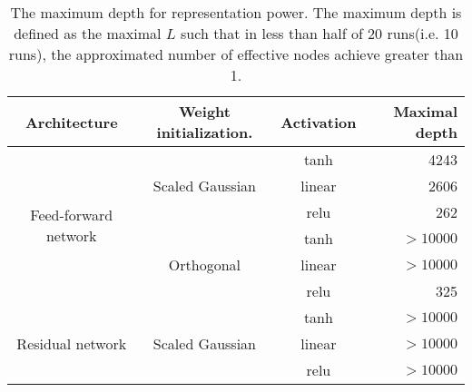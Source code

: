 \begin{table}[h]
    \centering
    \begin{tabular}{|c|c|c|r|}
    \hline
        Architecture&Weight initialization.&Activation&Maximal depth\\\hline
        \multirow{6}{*}{Feed-forward network} & \multirow{3}{*}{Scaled Gaussian} & tanh & 4243\\\cline{3-4}
         &  & linear & 2606\\\cline{3-4}
         &  & relu   & 262 \\\cline{2-4}
         & \multirow{3}{*}{Orthogonal} & tanh   & $>10000$\\\cline{3-4}
         &  & linear & $>10000$\\\cline{3-4}
         &  & relu   & 325\\\hline
         \multirow{3}{*}{Residual network} & \multirow{3}{*}{Scaled Gaussian} & tanh   & $>10000$\\\cline{3-4}
         &  & linear & $>10000$\\\cline{3-4}
         &  & relu   & $>10000$\\\hline
    \end{tabular}
    \caption[The maximum depth for different architectures and initializations]
    {The maximum depth for representation power. The maximum depth
    is defined as the maximal $L$ such that in less than half of 20
    runs(i.e. 10 runs), the approximated number of effective nodes achieve greater than 1.}
    \label{dead_table}
\end{table}

